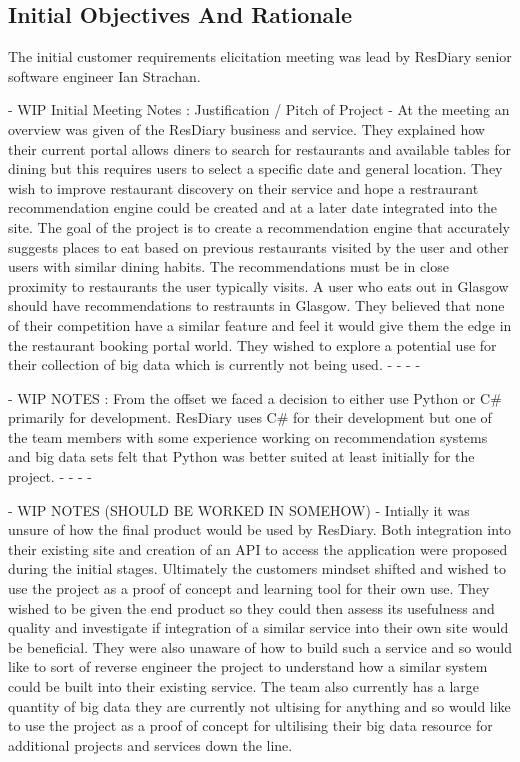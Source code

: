 \documentclass{l3proj}
\begin{document}
\subsection{Initial Objectives And Rationale}
\label{initobjectives}

The initial customer requirements elicitation meeting was lead by ResDiary senior software engineer Ian Strachan. 

- WIP Initial Meeting Notes : Justification / Pitch of Project -
At the meeting an overview was given of the ResDiary business and service. 
They explained how their current portal allows diners to search for restaurants and available tables for dining but this requires users to select a specific date and general location. 
They wish to improve restaurant discovery on their service and hope a restraurant recommendation engine could be created and at a later date integrated into the site.
The goal of the project is to create a recommendation engine that accurately suggests places to eat based on previous restaurants visited by the user and other users with similar dining habits.
The recommendations must be in close proximity to restaurants the user typically visits. A user who eats out in Glasgow should have recommendations to restraunts in Glasgow.
They believed that none of their competition have a similar feature and feel it would give them the edge in the restaurant booking portal world.
They wished to explore a potential use for their collection of big data which is currently not being used. 
- - - -  

- WIP NOTES : 
From the offset we faced a decision to either use Python or C# primarily for development. ResDiary uses C# for their development but one of the team members with some experience working on recommendation systems and big data sets felt that Python was better suited at least initially for the project. 
- - - - 

- WIP NOTES (SHOULD BE WORKED IN SOMEHOW) -
Intially it was unsure of how the final product would be used by ResDiary. 
Both integration into their existing site and creation of an API to access the application were proposed during the initial stages. 
Ultimately the customers mindset shifted and wished to use the project as a proof of concept and learning tool for their own use.
They wished to be given the end product so they could then assess its usefulness and quality and investigate if integration of a similar service into their own site would be beneficial.
They were also unaware of how to build such a service and so would like to sort of reverse engineer the project to understand how a similar system could be built into their existing service.
The team also currently has a large quantity of big data they are currently not ultising for anything and so would like to use the project as a proof of concept for ultilising their big data resource for additional projects and services down the line.
\end{document}
